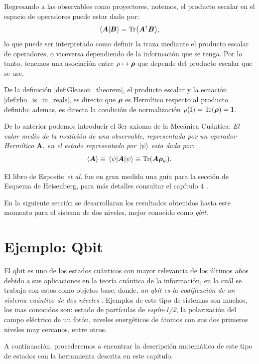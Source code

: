 \documentclass[../Main.tex]{subfiles}
\begin{document}
Regresando a las observables como proyectores, notemos, el producto escalar en el espacio de operadores puede estar dado por:
\begin{equation}
    \ip{\bm{A}}{\bm{B}}=\Tr(\bm{A}^\dagger\bm{B}),
\end{equation}
lo que puede ser interpretado como definir la traza mediante el producto escalar de operadores, o viceversa dependiendo de la información que se tenga.
Por lo tanto, tenemos una asociación entre $\rho\mapsto \bm{\rho}$ que depende del producto escalar que se use.

De la definición \eqref{def:Gleason_theorem}, el producto escalar y la ecuación \eqref{def:rho_is_in_reals}, es directo que $\bm{\rho}$ es Hermítico respecto al producto definido; ademas, es directa la condición de normalización $\rho\qty(\mathbb{I})=\Tr(\bm{\rho})=1$.

De lo anterior podemos introducir el 3er axioma de la Mecánica Cuántica:
\emph{El valor medio de la medición de una observable, representada por un operador Hermítico $\bm{A}$, en el estado representado por $\ket{\psi}$ esta dado por:}
\begin{equation}
    \expval{\bm{A}}\equiv \expval{\bm{A}}{\psi}\equiv\Tr(\bm{A}\bm{\rho}_\psi).
\end{equation}

El libro de Esposito \emph{et al.}\cite{Esposito2015} fue en gran medida una guía para la sección de Esquema de Heisenberg, para más detalles consultar el capítulo 4 .

En la siguiente sección se desarrollaran los resultados obtenidos hasta este momento para el sistema de dos niveles, mejor conocido como \emph{qbit}.

\section{Ejemplo: Qbit}
El qbit es uno de los estados cuánticos con mayor relevancia de los últimos años debido a sus aplicaciones en la teoría cuántica de la información, en la cuál se trabaja con estos como objetos base; donde, \emph{un qbit es la codificación de un sistema cuántico de dos niveles} \cite{nielsen2010quantum}. Ejemplos de este tipo de sistemas son muchos, los mas conocidos son: estado de partículas de \emph{espín-1/2}, la polarización del campo eléctrico de un fotón, niveles energéticos de átomos con sus dos primeros niveles muy cercanos, entre otros.

A continuación, procederemos a encontrar la descripción matemática de este tipo de estados con la herramienta descrita en este capítulo.
\end{document}
